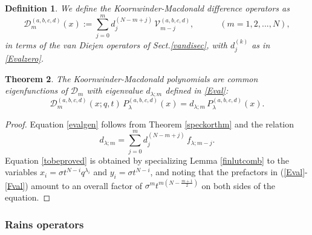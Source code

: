 \documentclass[12pt]{amsart}
\newtheorem{thm}{Theorem}[section]
\newtheorem{defn}[thm]{Definition}
\numberwithin{equation}{section}
\begin{document}
\begin{defn}\label{malphadef} We define the Koornwinder-Macdonald difference operators
as 
$${\mathcal D}_m^{(a,b,c,d)}(x):= \sum_{j=0}^m d_{j}^{(N-m+j)}\, {\mathcal V}_{m-j}^{(a,b,c,d)},\qquad  \quad
(m=1,2,...,N),$$
in terms of the van Diejen operators of Sect.\ref{vandisec}, with $d_{j}^{(k)}$ as in \eqref{Evalzero}.
\end{defn}


%
\begin{thm}\label{ABCDmacdopol}
The Koornwinder-Macdonald polynomials are common eigenfunctions of  ${\mathcal D}_m$ with eigenvalue $d_{\lambda;m}$ defined in \eqref{Eval}:
%
\begin{equation}\label{evalgen}
 {\mathcal D}_m^{(a,b,c,d)}(x;q,t)\, P_\lambda^{(a,b,c,d)}(x)= d_{\lambda;m}\, P_\lambda^{(a,b,c,d)}(x) .
 \end{equation}
\end{thm}
\begin{proof}
Equation \eqref{evalgen} follows from Theorem \ref{speckorthm} and the relation
\begin{equation}\label{tobeproved} d_{\lambda;m} =\sum_{j=0}^m d_{j}^{(N-m+j)}\, f_{\lambda;m-j} .
\end{equation}
Equation \eqref{tobeproved} is obtained by specializing Lemma \ref{finlutcomb} to the variables
$x_i=\sigma t^{N-i}q^{\lambda_i}$ and $y_i=\sigma t^{N-i}$, and 
noting that the prefactors in (\ref{Eval}-\ref{Fval}) amount to an overall factor of $\sigma^m t^{m(N-\frac{m+1}{2})}$ 
on both sides of the equation.
\end{proof}

\subsubsection{Rains operators}
\label{rainsec}
\end{document}
